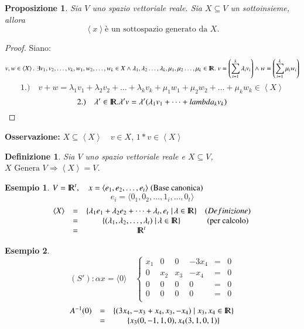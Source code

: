 \documentclass[12pt,a4paper]{article}
\theoremstyle{break}
\newtheorem{definition}{Definizione}[subsection]
\newtheorem{proposition}{Proposizione}[subsection]
\newtheorem{example}{Esempio}[subsection]
\newcommand\R{{\rm I\!R}}
\begin{document}
    \begin{proposition}
        Sia $V$ uno spazio vettoriale reale. Sia $X\subseteq V$ un sottoinsieme, allora
        \[\left<x\right>\text{è un sottospazio generato da } X.\] 
    \end{proposition}
    \begin{proof}
        Siano: 
        \[v,w\in \left< X\right>.\;\exists v_1,v_2,\dots ,v_k, w_1,w_2,\dots ,w_k\in X \wedge \lambda_1,\lambda_2\dots ,\lambda_k,\mu_1,\mu_2\dots ,\mu_k\in\R .\; v = \left(\sum_{i=1}^k \lambda_i v_i\right) \wedge w = \left(\sum_{i=1}^k \mu_i w_i\right)\]
        \[1.)\quad v+w = \lambda_1v_1+\lambda_2v_2+\dots +\lambda_kv_k+\mu_1w_1+\mu_2w_2+\dots +\mu_kw_k \in \left<X\right>\]
        \[2.)\quad\lambda'\in\R. \lambda'v = \lambda'(\lambda_1v_1+\dots + lambda_kv_k)\]
    \end{proof}
    \textbf{Osservazione:} $X\subseteq\left< X\right> \quad v\in X,\, 1*v \in \left< X \right>$
    \begin{definition}
        Sia $V$ uno spazio vettoriale reale e $X\subseteq V$, $X \text{ Genera } V \Rightarrow \left< X \right> = V$.
    \end{definition}
    \begin{example}
        $V = \R^t,\quad x = \langle e_1,e_2,\dots ,e_t\rangle\;(\text{Base canonica})$
        \[e_i = \langle 0_1,0_2,\dots ,1_i,\dots,0_t\rangle\]
        \[
            \begin{matrix}
                \left< X \right> & = & \{\lambda_1e_1 +\lambda_2e_2+\dots +\lambda_t,e_t\; |\, \lambda\in\R\} & (Definizione)\\
                & = & \{(\lambda_1,\lambda_2,\dots ,\lambda_t)\; |\,\lambda\in\R\} & (\text{per calcolo}) \\
                & = & \R^t \\
            \end{matrix}
        \]
    \end{example}
    \begin{example}
        \[(S'): \alpha x = \langle 0 \rangle \quad 
        \left\{
            \begin{matrix}
                x_1 & 0 & 0 & -3x_4 & = & 0 \\
                0 & x_2 & x_3 & -x_4 & = & 0 \\
                0 & 0 & 0 & 0 & = & 0 \\
                0 & 0 & 0 & 0 & = & 0 \\
            \end{matrix}
        \right.
        \]
        \[
            \begin{matrix}
                A^{-1}(0) & = & \{(3x_4,-x_3+x_4,x_3,-x_4)\; |\; x_3,x_4\in\R\} \\
                & = & \{x_3(0,-1,1,0),x_4(3,1,0,1)\}
            \end{matrix}
        \]
    \end{example}
\end{document}

